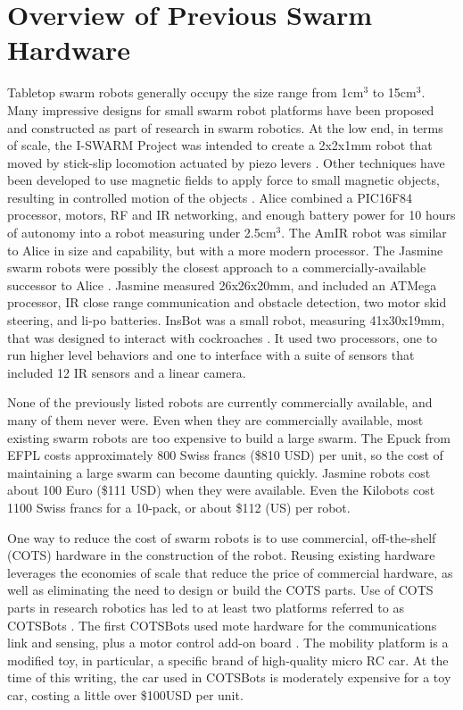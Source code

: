 \documentclass[letterpaper, 10 pt, conference]{ieeeconf}  %
\begin{document}
\section{Overview of Previous Swarm Hardware}

Tabletop swarm robots generally occupy the size range from 1cm$^3$ to 15cm$^3$.
Many impressive designs for small swarm robot platforms have been proposed and constructed as part of research in swarm robotics. 
At the low end, in terms of scale, the I-SWARM Project was intended to create a 2x2x1mm robot that moved by stick-slip locomotion actuated by piezo levers \cite{seyfried2005swarm}. 
Other techniques have been developed to use magnetic fields to apply force to small magnetic objects, resulting in controlled motion of the objects \cite{floyd2008untethered, pelrine2012diamagnetically}.
Alice \cite{caprari1998autonomous} combined a PIC16F84 processor, motors, RF and IR networking, and enough battery power for 10 hours of autonomy into a robot measuring under 2.5cm$^3$. 
The AmIR robot was similar to Alice in size and capability, but with a more modern processor\cite{arvin2009development}.
The Jasmine swarm robots were possibly the closest approach to a commercially-available successor to Alice \cite{kernbach2011swarmrobot}.
Jasmine measured 26x26x20mm, and included an ATMega processor, IR close range communication and obstacle detection, two motor skid steering, and li-po batteries.
InsBot was a small robot, measuring 41x30x19mm, that was designed to interact with cockroaches \cite{colot2004insbot}.
It used two processors, one to run higher level behaviors and one to interface with a suite of sensors that included 12 IR sensors and a linear camera. 

None of the previously listed robots are currently commercially available, and many of them never were. 
Even when they are commercially available, most existing swarm robots are too expensive to build a large swarm.
The Epuck from EFPL costs approximately 800 Swiss francs (\$810 USD) per unit, so the cost of maintaining a large swarm can become daunting quickly. 
Jasmine robots cost about 100 Euro (\$111 USD) when they were available. 
Even the Kilobots \cite{rubenstein2014kilobot} cost 1100 Swiss francs for a 10-pack, or about \$112 (US) per robot. 

One way to reduce the cost of swarm robots is to use commercial, off-the-shelf (COTS) hardware in the construction of the robot. 
Reusing existing hardware leverages the economies of scale that reduce the price of commercial hardware, as well as eliminating the need to design or build the COTS parts. 
Use of COTS parts in research robotics has led to at least two platforms referred to as COTSBots \cite{bergbreiter2003cotsbots, soule2011cotsbots}.
The first COTSBots used mote hardware for the communications link and sensing, plus a motor control add-on board \cite{bergbreiter2003cotsbots}. 
The mobility platform is a modified toy, in particular, a specific brand of high-quality micro RC car.
At the time of this writing, the car used in COTSBots is moderately expensive for a toy car, costing a little over \$100USD per unit. 
 
\end{document}
